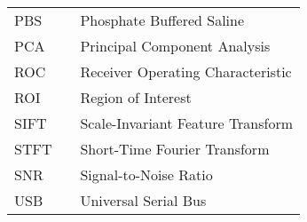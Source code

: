 \begin{center}
\begin{tabular}{lll}
    PBS  & \dotfill & Phosphate Buffered Saline \\
    PCA  & \dotfill & Principal Component Analysis \\
    ROC  & \dotfill & Receiver Operating Characteristic \\
    ROI  & \dotfill & Region of Interest \\
    SIFT & \dotfill & Scale-Invariant Feature Transform \\
    STFT & \dotfill & Short-Time Fourier Transform \\
    SNR  & \dotfill & Signal-to-Noise Ratio \\
    USB  & \dotfill & Universal Serial Bus \\
  \end{tabular}
\end{center}
\cleardoublepage


\newpage
\endofprelim
